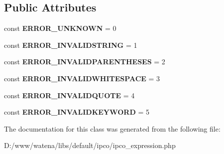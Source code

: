 \subsection*{Public Attributes}
\begin{DoxyCompactItemize}
\item 
\hypertarget{class_i_p_c_o___expression_ac8e1e362f8b3f4d03369cc77cd35982a}{const {\bfseries E\-R\-R\-O\-R\-\_\-\-U\-N\-K\-N\-O\-W\-N} = 0}\label{class_i_p_c_o___expression_ac8e1e362f8b3f4d03369cc77cd35982a}

\item 
\hypertarget{class_i_p_c_o___expression_a45e539be0a0195c6fb11a3f892394a44}{const {\bfseries E\-R\-R\-O\-R\-\_\-\-I\-N\-V\-A\-L\-I\-D\-S\-T\-R\-I\-N\-G} = 1}\label{class_i_p_c_o___expression_a45e539be0a0195c6fb11a3f892394a44}

\item 
\hypertarget{class_i_p_c_o___expression_a9cf91677dff4aedfd18dcd13d871d56e}{const {\bfseries E\-R\-R\-O\-R\-\_\-\-I\-N\-V\-A\-L\-I\-D\-P\-A\-R\-E\-N\-T\-H\-E\-S\-E\-S} = 2}\label{class_i_p_c_o___expression_a9cf91677dff4aedfd18dcd13d871d56e}

\item 
\hypertarget{class_i_p_c_o___expression_ae2037fa02e6099cc2518044eafa9c7cd}{const {\bfseries E\-R\-R\-O\-R\-\_\-\-I\-N\-V\-A\-L\-I\-D\-W\-H\-I\-T\-E\-S\-P\-A\-C\-E} = 3}\label{class_i_p_c_o___expression_ae2037fa02e6099cc2518044eafa9c7cd}

\item 
\hypertarget{class_i_p_c_o___expression_ad953e7bb7806b0588ae2a9af142ebd89}{const {\bfseries E\-R\-R\-O\-R\-\_\-\-I\-N\-V\-A\-L\-I\-D\-Q\-U\-O\-T\-E} = 4}\label{class_i_p_c_o___expression_ad953e7bb7806b0588ae2a9af142ebd89}

\item 
\hypertarget{class_i_p_c_o___expression_a0a5bcde779f860cd4b534c948435d092}{const {\bfseries E\-R\-R\-O\-R\-\_\-\-I\-N\-V\-A\-L\-I\-D\-K\-E\-Y\-W\-O\-R\-D} = 5}\label{class_i_p_c_o___expression_a0a5bcde779f860cd4b534c948435d092}

\end{DoxyCompactItemize}


The documentation for this class was generated from the following file\-:\begin{DoxyCompactItemize}
\item 
D\-:/www/watena/libs/default/ipco/ipco\-\_\-expression.\-php\end{DoxyCompactItemize}
